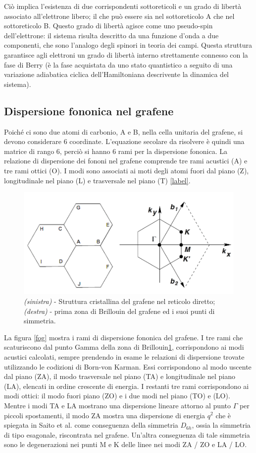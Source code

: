 \documentclass[a4paper,titlepage]{book}
\begin{document}
Ciò implica l'esistenza di due corrispondenti sottoreticoli e un grado di libertà associato all'elettrone libero; il che può essere sia nel sottoreticolo A che nel sottoreticolo B. Questo grado di libertà agisce come uno pseudo-spin dell'elettrone: il sistema risulta descritto da una funzione d'onda a due componenti, che sono l'analogo degli spinori in teoria dei campi. Questa struttura garantisce agli elettroni un grado di libertà interno strettamente connesso con la fase di Berry (è la fase acquistata da uno stato quantistico a seguito di una variazione adiabatica ciclica dell'Hamiltoniana descrivente la dinamica del sistema). 

\subsection{Dispersione fononica nel grafene}
Poiché ci sono due atomi di carbonio, A e B, nella cella unitaria del grafene, si devono considerare 6 coordinate. L'equazione secolare da risolvere è quindi una matrice di rango 6, perciò si hanno 6 rami per la dispersione fononica. La relazione di dispersione dei fononi  nel grafene comprende tre rami acustici (A) e tre rami ottici (O). I modi sono associati ai moti degli atomi fuori dal piano (Z), longitudinale nel piano (L) e trasversale nel piano (T) \ref{label}.\\
\begin{figure}[h!] 
	\centering
	\includegraphics[width=0.6\columnwidth]{primitivecellgraph.png}
	\caption{ 	\label{labe}
		\textit{(sinistra)} - Struttura cristallina del grafene nel reticolo diretto; \textit{(destra)} - prima zona di Brillouin del grafene ed i suoi punti di simmetria.
	}
\end{figure}
La figura \ref{fog} mostra i rami di dispersione fononica del grafene. I tre rami che scaturiscono dal punto Gamma della zona di Brillouin\ref{labe}, corrispondono ai modi acustici calcolati, sempre prendendo in esame le relazioni di dispersione trovate utilizzando le codizioni di Born-von Karman. Essi corrispondono al modo uscente dal piano (ZA), il modo trasversale nel piano (TA) e longitudinale nel piano (LA), elencati in ordine crescente di energia. I restanti tre rami corrispondono ai modi ottici: il modo fuori piano (ZO) e i due modi nel piano (TO) e (LO). Mentre i modi TA e LA mostrano una dispersione lineare attorno al punto $\Gamma$ per piccoli spostamenti, il modo ZA mostra una dispersione di energia $q^2$ che è spiegata in Saito et al.\cite{Saito} come conseguenza della simmetria $D_{6h}$, ossia la simmetria di tipo esagonale, riscontrata nel grafene. Un'altra conseguenza di tale simmetria sono le degenerazioni nei punti M e K delle linee nei modi ZA / ZO e LA / LO.
\end{document}
